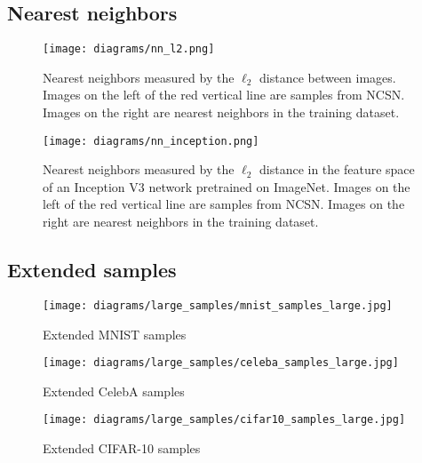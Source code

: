\documentclass{article}
\begin{document}
\subsection{Nearest neighbors}\label{app:nn}
\vspace*{\fill}
\FloatBarrier
\begin{figure}[H]
    \centering
    \texttt{[image: diagrams/nn\_l2.png]}
    \caption{Nearest neighbors measured by the $\ell_2$ distance between images. Images on the left of the red vertical line are samples from NCSN. Images on the right are nearest neighbors in the training dataset.}
\end{figure}
\begin{figure}[H]
    \centering
    \texttt{[image: diagrams/nn\_inception.png]}
    \caption{Nearest neighbors measured by the $\ell_2$ distance in the feature space of an Inception V3 network pretrained on ImageNet. Images on the left of the red vertical line are samples from NCSN. Images on the right are nearest neighbors in the training dataset.}
\end{figure}
\FloatBarrier
\vfill
\newpage

\subsection{Extended samples}
\vspace*{\fill}
\FloatBarrier
\begin{figure}[H]
    \centering
    \texttt{[image: diagrams/large\_samples/mnist\_samples\_large.jpg]}
    \caption{Extended MNIST samples}
    \label{fig:mnist_large}
\end{figure}
\FloatBarrier
\vfill
\newpage
\vspace*{\fill}
\FloatBarrier
\begin{figure}[H]
    \centering
    \texttt{[image: diagrams/large\_samples/celeba\_samples\_large.jpg]}
    \caption{Extended CelebA samples}
    \label{fig:celeba_large}
\end{figure}
\FloatBarrier
\vfill
\newpage
\vspace*{\fill}
\FloatBarrier
\begin{figure}[H]
    \centering
    \texttt{[image: diagrams/large\_samples/cifar10\_samples\_large.jpg]}
    \caption{Extended CIFAR-10 samples}
    \label{fig:cifar10_large}
\end{figure}
\FloatBarrier
\vfill
\newpage
\end{document}
